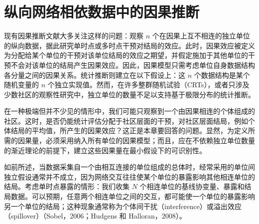 \chapter{纵向网络相依数据中的因果推断}
\label{ch:longitudinal-network-dependent-data}

现有因果推断文献大多关注这样的问题：观察 $n$ 个在因果上互不相连的独立单位的纵向数据，据此研究单时点或多时点干预对结局的效应。此时，因果效应被定义为分配给某个单位的干预对该单位结局的效应之期望，并假定施加于其他单位的干预不会对该单位的结局产生因果效应。因此，因果模型只需考虑单位自身数据结构各分量之间的因果关系。统计推断则建立在以下假设上：这 $n$ 个数据结构是某个随机变量的 $n$ 个独立实现值。然而，在许多整群随机试验（CRTs），或者只涉及少数社区的观察性研究中，独立单位的数量不足以支持基于极限分布的统计推断。

\begin{sourcebox}
在一种极端但并不少见的情形中，我们可能只观察到一个由因果相连的个体组成的社区。这时，是否仍能统计评估分配于社区层面的干预，对社区层面结局，例如个体结局的平均值，所产生的因果效应？这正是本章要回答的问题。显然，为定义所需的因果量，必须采用纳入所有单位的因果模型；而且，应在不依赖独立单位数量的渐近理论的前提下，建立这些因果量在最小假设下的可识别性。
\end{sourcebox}

如前所述，当数据采集自一个由相互连接的单位组成的总体时，经常采用的单位间独立假设通常并不成立，因为网络交互往往使某个单位的暴露影响其他相连单位的结局。考虑单时点暴露的情形：我们收集 $N$ 个相连单位的基线协变量、暴露和结局数据。可以预期，任意两个相连单位之间的交互，都可能使一个单位的暴露影响另一个单位的结局；这种现象通常称为个体间干扰（interference）或溢出效应（spillover）（Sobel，2006；Hudgens 和 Halloran，2008）。

